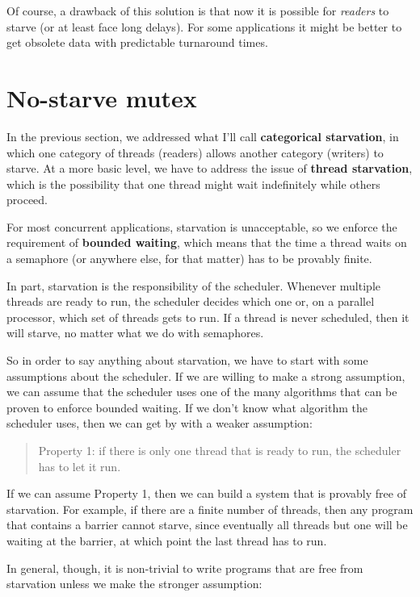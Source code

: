 \documentclass{book}
\newcommand{\clearemptydoublepage}{\newpage\cleardoublepage}
\begin{document}
Of course, a drawback of this solution is that now it is
possible for {\em readers} to starve (or at least face long
delays).  For some applications it might be better to get
obsolete data with predictable turnaround times.



\clearemptydoublepage
\section{No-starve mutex}
\label{props}

In the previous section, we addressed what I'll call
{\bf categorical starvation}, in which one category of threads
(readers) allows another category (writers) to starve.
At a more basic level, we have to address the issue of
{\bf thread starvation}, which is the possibility that one
thread might wait indefinitely while others proceed.

For most concurrent applications, starvation is unacceptable,
so we enforce the requirement of {\bf bounded waiting}, which
means that the time a thread waits on a semaphore (or anywhere
else, for that matter) has to be provably finite.

In part, starvation is the responsibility of the scheduler.
Whenever multiple threads are ready to run, the scheduler decides
which one or, on a parallel processor, which set of threads gets
to run.  If a thread is never scheduled, then it will starve,
no matter what we do with semaphores.

So in order to say anything about starvation, we have to start
with some assumptions about the scheduler.  If we are willing
to make a strong assumption, we can assume that the scheduler
uses one of the many algorithms that can be proven to enforce
bounded waiting.  If we don't know what algorithm the scheduler
uses, then we can get by with a weaker assumption:

\begin{quote}
Property 1: if there is only one thread that is ready to
run, the scheduler has to let it run.
\end{quote}

If we can assume Property 1, then we can build a system
that is provably free of starvation.  For example, if there
are a finite number of threads, then any program that contains
a barrier cannot starve, since eventually all threads but one
will be waiting at the barrier, at which point the last thread
has to run.

In general, though, it is non-trivial to write programs that
are free from starvation unless we make the stronger
assumption:
\end{document}
